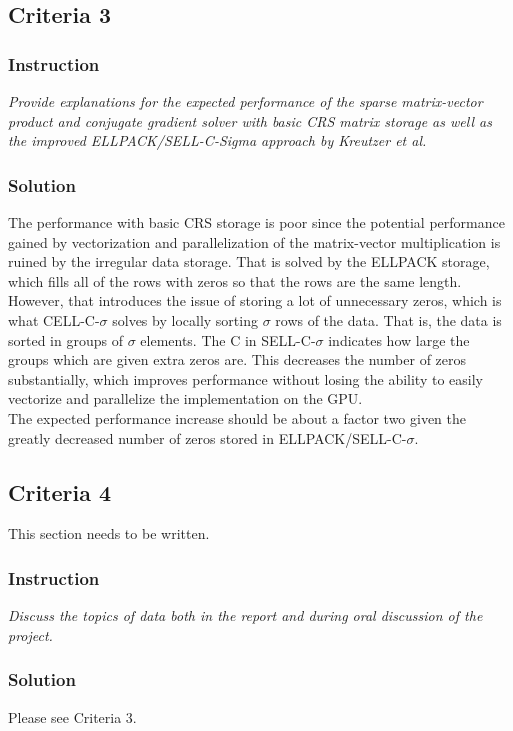 \documentclass[10pt]{article}
\begin{document}
\subsection{Criteria 3}
\subsubsection{Instruction}
\textit{Provide explanations for the expected performance of the sparse matrix-vector product and conjugate gradient solver with basic CRS matrix storage as well as the improved ELLPACK/SELL-C-Sigma approach by Kreutzer et al.}
\subsubsection{Solution}
The performance with basic CRS storage is poor since the potential performance gained by vectorization and parallelization of the matrix-vector multiplication is ruined by the irregular data storage. That is solved by the ELLPACK storage, which fills all of the rows with zeros so that the rows are the same length. \\

However, that introduces the issue of storing a lot of unnecessary zeros, which is what CELL-C-$\sigma$ solves by locally sorting $\sigma$ rows of the data. That is, the data is sorted in groups of $\sigma$ elements. The C in SELL-C-$\sigma$ indicates how large the groups which are given extra zeros are. This decreases the number of zeros substantially, which improves performance without losing the ability to easily vectorize and parallelize the implementation on the GPU. \\

The expected performance increase should be about a factor two given the greatly decreased number of zeros stored in ELLPACK/SELL-C-$\sigma$.
\subsection{Criteria 4}
This section needs to be written.
\subsubsection{Instruction}
\textit{Discuss the topics of data both in the report and during oral discussion of the project.}
\subsubsection{Solution}
Please see Criteria 3.
\end{document}
